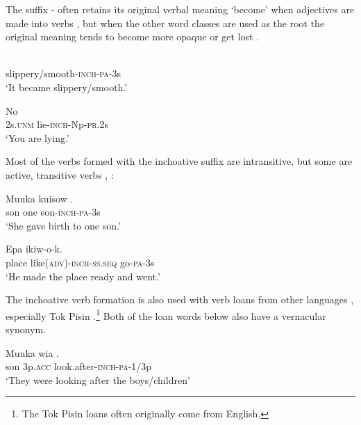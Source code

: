 The suffix - often retains its original verbal meaning `become' when adjectives are made into verbs , but when the other word classes are used as the root the original meaning tends to become more opaque or get lost . 

\ea%
\label{ex:3:x201}
\gll {} \\
slippery/smooth-\textsc{inch}-\textsc{pa}-3s \\
\glt`It became slippery/smooth.' 
\z

\ea%
\label{ex:3:x202}
\gll No  \\
2s.\textsc{unm} lie-\textsc{inch}-Np-\textsc{pr}.2s \\
\glt`You are lying.' 
\z

Most of the verbs formed with the inchoative suffix are intransitive, but some are active, transitive verbs , :

\ea%
\label{ex:3:x203}
\gll Muuka kuisow . \\
son one son-\textsc{inch}-\textsc{pa}-3s \\
\glt`She gave birth to one son.'
\z

\ea%
\label{ex:3:x204}
\gll Epa  ikiw-o-k. \\
place like(\textsc{adv})-\textsc{inch}-\textsc{ss}.\textsc{seq} go-\textsc{pa}-3s \\
\glt`He made the place ready and went.'
\z

The inchoative verb formation is also used with verb loans from other languages , especially Tok Pisin .\footnote{The Tok Pisin loans often originally come from English.} Both of the loan words below also have a vernacular synonym.

\ea%
\label{ex:3:x487}
\gll Muuka wia .   \\
son 3p.\textsc{acc} look.after-\textsc{inch}-\textsc{pa}-1/3p\\
\glt`They were looking after the boys/children'
\z

